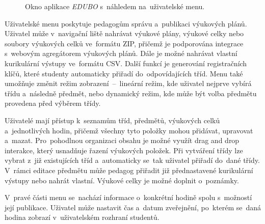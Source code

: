 \documentclass[male,czech,api_bc]{kitheses}
\begin{document}
\begin{figure}[H]
	\centering
	\caption{Okno aplikace \textit{EDUBO} s~náhledem na~uživatelské menu.}
	\label{fig:edubo-4}
\end{figure}

Uživatelské menu poskytuje pedagogům správu a~publikaci výukových plánů. Uživatel může v~navigační liště nahrávat výukové plány, výukové celky nebo soubory výukových celků ve~formátu ZIP, přičemž je podporována integrace s~webovým agregátorem výukových plánů. Dále je možné nahrávat vlastní kurikulární výstupy ve~formátu CSV. Další funkcí je generování registračních klíčů, které studenty automaticky přiřadí do~odpovídajících tříd. Menu také umožňuje změnit režim zobrazení~--~lineární režim, kde uživatel nejprve vybírá třídu a~následně předmět, nebo dynamický režim, kde může být volba předmětu provedena před výběrem třídy.

Uživatelé mají přístup k~seznamům tříd, předmětů, výukových celků a~jednotlivých hodin, přičemž všechny tyto položky mohou přidávat, upravovat a~mazat. Pro~pohodlnou organizaci obsahu je možné využít drag and drop interakce, který usnadňuje řazení výukových položek. Při vytváření třídy lze vybrat z~již existujících tříd a~automaticky se~tak uživatel přiřadí do~dané třídy. V~rámci editace předmětu může pedagog přiřadit již přednastavené kurikulární výstupy nebo nahrát vlastní. Výukové celky je možné doplnit o~poznámky.

V~pravé části menu se~nachází informace o~konkrétní hodině spolu s~možností její publikace. Uživatel může nastavit čas a~datum zveřejnění, po~kterém se~daná hodina zobrazí v~uživatelském rozhraní studentů.
\end{document}

